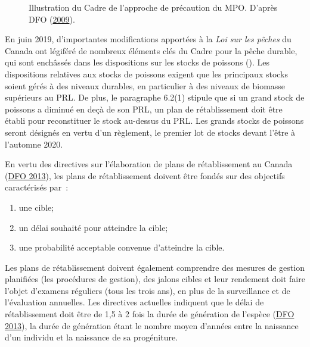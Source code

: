 \documentclass[french,11pt]{book}
\begin{document}
\begin{figure}[htb]

{\centering {} 

}

\caption{Illustration du Cadre de l'approche de précaution du MPO. D'après DFO (\protect\hyperlink{ref-dfo2009}{2009}).}\label{fig:pa-illustration}
\end{figure}
En juin 2019, d'importantes modifications apportées à la \emph{Loi sur les pêches} du Canada ont légiféré de nombreux éléments clés du Cadre pour la pêche durable, qui sont enchâssés dans les dispositions sur les stocks de poissons (). Les dispositions relatives aux stocks de poissons exigent que les principaux stocks soient gérés à des niveaux durables, en particulier à des niveaux de biomasse supérieurs au PRL. De plus, le paragraphe 6.2(1) stipule que si un grand stock de poissons a diminué en deçà de son PRL, un plan de rétablissement doit être établi pour reconstituer le stock au-dessus du PRL. Les grands stocks de poissons seront désignés en vertu d'un règlement, le premier lot de stocks devant l'être à l'automne 2020.

En vertu des directives sur l'élaboration de plans de rétablissement au Canada (\protect\hyperlink{ref-dfo2013}{DFO 2013}), les plans de rétablissement doivent être fondés sur des objectifs caractérisés par~:
\begin{enumerate}
\def\labelenumi{\arabic{enumi}.}

\item
  une cible;
\item
  un délai souhaité pour atteindre la cible;
\item
  une probabilité acceptable convenue d'atteindre la cible.
\end{enumerate}
Les plans de rétablissement doivent également comprendre des mesures de gestion planifiées (les procédures de gestion), des jalons cibles et leur rendement doit faire l'objet d'examens réguliers (tous les trois ans), en plus de la surveillance et de l'évaluation annuelles. Les directives actuelles indiquent que le délai de rétablissement doit être de 1,5 à 2 fois la durée de génération de l'espèce (\protect\hyperlink{ref-dfo2013}{DFO 2013}), la durée de génération étant le nombre moyen d'années entre la naissance d'un individu et la naissance de sa progéniture.
\end{document}
